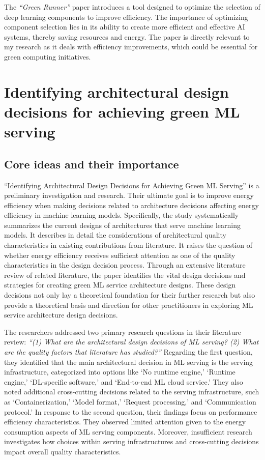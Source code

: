 \documentclass[11pt]{report}
\begin{document}
The \textit{``Green Runner''} paper introduces a tool designed to optimize the selection of deep learning components to improve efficiency. The importance of optimizing component selection lies in its ability to create more efficient and effective AI systems, thereby saving resources and energy. The paper is directly relevant to my research as it deals with efficiency improvements, which could be essential for green computing initiatives.

\section{Identifying architectural design decisions for achieving green ML serving}
\label{sec:ADDs}


\subsection{Core ideas and their importance}
\label{subsec:coreideas1}

``Identifying Architectural Design Decisions for Achieving Green ML Serving'' is a preliminary investigation and research. Their ultimate goal is to improve energy efficiency when making decisions related to architecture decisions affecting energy efficiency in machine learning models. Specifically, the study systematically summarizes the current designs of architectures that serve machine learning models. It describes in detail the considerations of architectural quality characteristics in existing contributions from literature. It raises the question of whether energy efficiency receives sufficient attention as one of the quality characteristics in the design decision process. Through an extensive literature review of related literature, the paper identifies the vital design decisions and strategies for creating green ML service architecture designs. These design decisions not only lay a theoretical foundation for their further research but also provide a theoretical basis and direction for other practitioners in exploring ML service architecture design decisions.

The researchers addressed two primary research questions in their literature review: \textit{``(1) What are the architectural design decisions of ML serving? (2) What are the quality factors that literature has studied?''} Regarding the first question, they identified that the main architectural decision in ML serving is the serving infrastructure, categorized into options like `No runtime engine,' `Runtime engine,' `DL-specific software,' and `End-to-end ML cloud service.' They also noted additional cross-cutting decisions related to the serving infrastructure, such as `Containerization,' `Model format,' `Request processing,' and `Communication protocol.' In response to the second question, their findings focus on performance efficiency characteristics. They observed limited attention given to the energy consumption aspects of ML serving components. Moreover, insufficient research investigates how choices within serving infrastructures and cross-cutting decisions impact overall quality characteristics.
\end{document}
